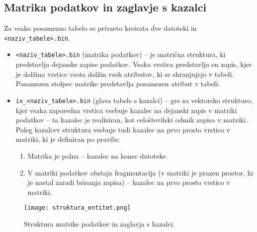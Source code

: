 \documentclass[a4paper,12pt,openright]{book}
\begin{document}
        \subsection{Matrika podatkov in zaglavje s kazalci}
        Za vsako posamezno tabelo se privzeto kreirata dve datoteki  in {\tt <naziv\_tabele>.bin}.
        \begin{itemize}
            \item {\tt <naziv\_tabele>.bin} (matrika podatkov) – je matrična struktura, ki predstavlja dejanske zapise podatkov. Vsaka vrstica predstavlja en zapis, kjer je dolžina vrstice vsota dolžin vseh atributov, ki se shranjujejo v tabeli. Posamezen stolpec matrike predstavlja posamezen atribut v tabeli.
            \item {\tt ix\_<naziv\_tabele>.bin} (glava tabele s kazalci) – gre za vektorsko strukturo, kjer vsaka zaporedna vrstica vsebuje kazalec na dejanski zapis v matriki podatkov – ta kazalec je realiziran, kot celoštevilski odmik zapisa v matriki. Poleg kazalcev struktura vsebuje tudi kazalec na prvo prosto vrstico v matriki, ki je definiran po pravilu:
            \begin{enumerate}
                \item Matrika je polna – kazalec na konec datoteke.
                \item V matriki podatkov obstaja fragmentacija (v matriki je prazen prostor, ki je nastal zaradi brisanja zapisa) – kazalec na prvo prosto vrstico v matriki.
            \end{enumerate}
        \end{itemize}

        \begin{figure}[h]
                \centerline{\texttt{[image: struktura\_entitet.png]}}
                \caption{Struktura matrike podatkov in zaglavja s kazalci.}
                \label{sl:matrix_and_header}
            \end{figure}
        
\end{document}
